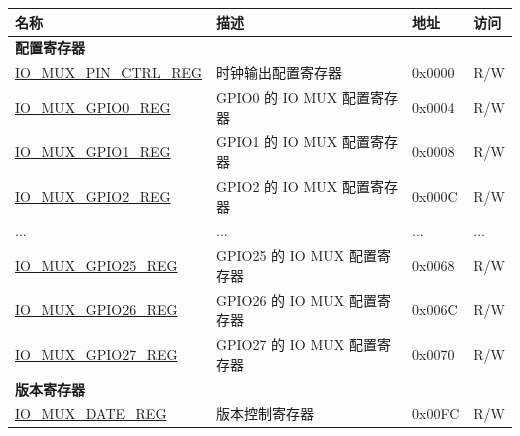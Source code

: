 \begin{longtable}{ | p{6cm} | p{7.6cm} | p{1.3cm} | p{1cm} | }
\hline\rowcolor{lightgray}
\textbf{名称} & \textbf{描述} & \textbf{地址} & \textbf{访问} \\ \hline
\endhead

\multicolumn{4}{|l|}{\textbf{配置寄存器}} \\ \hline

\hyperref[regdesc:IOMUXPINCTRLREG]{IO\_MUX\_PIN\_CTRL\_REG} & 时钟输出配置寄存器 & 0x0000 & R/W \\ \hline

\hyperref[regdesc:IOMUXGPIONREG]{IO\_MUX\_GPIO0\_REG} & GPIO0 的 IO MUX 配置寄存器 & 0x0004 & R/W \\ \hline

\hyperref[regdesc:IOMUXGPIONREG]{IO\_MUX\_GPIO1\_REG} & GPIO1 的 IO MUX 配置寄存器 & 0x0008 & R/W \\ \hline

\hyperref[regdesc:IOMUXGPIONREG]{IO\_MUX\_GPIO2\_REG} & GPIO2 的 IO MUX 配置寄存器 & 0x000C & R/W \\ \hline

...& ... & ... & ... \\ \hline

\hyperref[regdesc:IOMUXGPIONREG]{IO\_MUX\_GPIO25\_REG} & GPIO25 的 IO MUX 配置寄存器 & 0x0068 & R/W \\ \hline

\hyperref[regdesc:IOMUXGPIONREG]{IO\_MUX\_GPIO26\_REG} & GPIO26 的 IO MUX 配置寄存器 & 0x006C & R/W \\ \hline

\hyperref[regdesc:IOMUXGPIONREG]{IO\_MUX\_GPIO27\_REG} & GPIO27 的 IO MUX 配置寄存器 & 0x0070 & R/W \\ \hline

\multicolumn{4}{|l|}{\textbf{版本寄存器}} \\ \hline
\hyperref[regdesc:IOMUXDATEREG]{IO\_MUX\_DATE\_REG} & 版本控制寄存器 & 0x00FC & R/W \\ \hline

\end{longtable}
